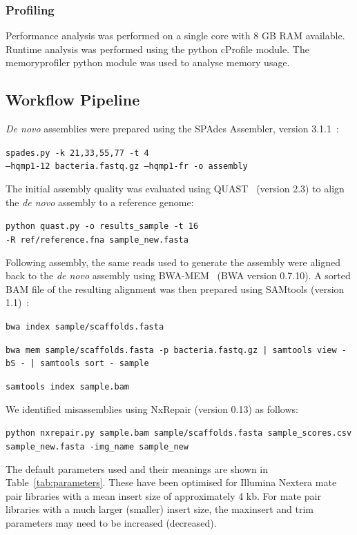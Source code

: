 \documentclass[fleqn,10pt]{wlpeerj}
\begin{document}
\subsubsection*{Profiling}
Performance analysis was performed on a single core with 8 GB RAM available. Runtime analysis was performed using the python cProfile module. The memoryprofiler python module was used to analyse memory usage.

\subsection*{Workflow Pipeline}
\textit{De novo} assemblies were prepared using the SPAdes Assembler, version 3.1.1~\citep{Bankevich2012}:

\texttt{spades.py -k 21,33,55,77 -t 4 \\ --hqmp1-12 bacteria.fastq.gz  --hqmp1-fr -o assembly}

The initial assembly quality was evaluated using QUAST~\citep{gurevich2013} (version 2.3) to align the \textit{de novo} assembly to a reference genome:

\texttt{python quast.py -o results\_sample -t 16 \\  -R ref/reference.fna sample\_new.fasta }

  Following assembly, the same reads used to generate the assembly were aligned back to the \textit{de novo} assembly using BWA-MEM~\citep{li2013} (BWA version 0.7.10). A sorted BAM file of the resulting alignment was then prepared using SAMtools (version 1.1)~\citep{li2009}: 

\texttt{bwa index sample/scaffolds.fasta}

\texttt{bwa mem sample/scaffolds.fasta -p bacteria.fastq.gz | samtools view -bS - |  samtools sort - sample}

\texttt{samtools index sample.bam}

We identified misassemblies using NxRepair (version 0.13) as follows:

\texttt{python nxrepair.py sample.bam   sample/scaffolds.fasta sample\_scores.csv  sample\_new.fasta -img\_name sample\_new}


The default parameters used and their meanings are shown in Table~\ref{tab:parameters}. These have been optimised for Illumina Nextera mate pair libraries with a mean insert size of approximately 4 kb. For mate pair libraries with a much larger (smaller) insert size, the maxinsert and trim parameters may need to be increased (decreased).
\end{document}
